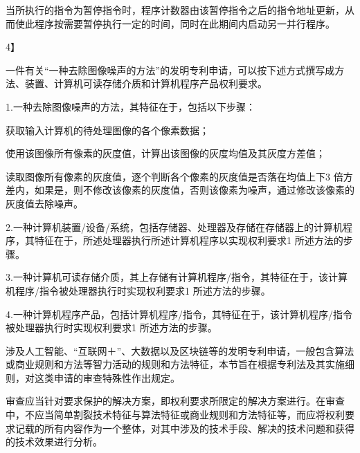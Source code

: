 {\setlength{\parindent}{20.6bp}当所执行的指令为暂停指令时，程序计数器由该暂停指令之后的指令地址更新，从而使此程序按需要暂停执行一定的时间，同时在此期间内启动另一并行程序。\par}

{4】\par}

{\setlength{\parindent}{20.6bp}一件有关“一种去除图像噪声的方法”的发明专利申请，可以按下述方式撰写成方法、装置、计算机可读存储介质和计算机程序产品权利要求。\par}

{\setlength{\parindent}{20.6bp}1.一种去除图像噪声的方法，其特征在于，包括以下步骤：\par}

{\setlength{\parindent}{20.6bp}获取输入计算机的待处理图像的各个像素数据；\par}

{\setlength{\parindent}{20.6bp}使用该图像所有像素的灰度值，计算出该图像的灰度均值及其灰度方差值；\par}

{\setlength{\parindent}{20.6bp}读取图像所有像素的灰度值，逐个判断各个像素的灰度值是否落在均值上下3 倍方差内，如果是，则不修改该像素的灰度值，否则该像素为噪声，通过修改该像素的灰度值去除噪声。\par}

{\setlength{\parindent}{20.6bp}2.一种计算机装置/设备/系统，包括存储器、处理器及存储在存储器上的计算机程序，其特征在于，所述处理器执行所述计算机程序以实现权利要求1 所述方法的步骤。\par}

{\setlength{\parindent}{20.6bp}3.一种计算机可读存储介质，其上存储有计算机程序/指令，其特征在于，该计算机程序/指令被处理器执行时实现权利要求1 所述方法的步骤。\par}

{\setlength{\parindent}{20.6bp}4.一种计算机程序产品，包括计算机程序/指令，其特征在于，该计算机程序/指令被处理器执行时实现权利要求1 所述方法的步骤。\par}

{\setlength{\parindent}{20.6bp}涉及人工智能、“互联网＋”、大数据以及区块链等的发明专利申请，一般包含算法或商业规则和方法等智力活动的规则和方法特征，本节旨在根据专利法及其实施细则，对这类申请的审查特殊性作出规定。\par}

{\setlength{\parindent}{20.6bp}审查应当针对要求保护的解决方案，即权利要求所限定的解决方案进行。在审查中，不应当简单割裂技术特征与算法特征或商业规则和方法特征等，而应将权利要求记载的所有内容作为一个整体，对其中涉及的技术手段、解决的技术问题和获得的技术效果进行分析。\par}


